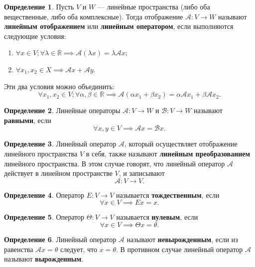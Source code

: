 \documentclass[a5paper, 11pt]{extbook}
\theoremstyle{definition}
\theoremstyle{definition}
\newtheorem{definition}{Определение}[chapter]
\begin{document}
\begin{definition}
    Пусть \(V\) и \(W\) — линейные пространства (либо оба вещественные, либо оба комплексные). Тогда отображение \(\mathcal{A}: V \to W\) называют \textbf{линейным отображением} или \textbf{линейным оператором}, если выполняются следующие условия:
    \begin{enumerate}
        \item \(\forall x \in V; \forall \lambda \in \mathbb{R} \implies \mathcal{A} (\lambda x) = \lambda \mathcal{A} x\);
        \item \(\forall x_1, x_2 \in X \implies \mathcal{A} x + \mathcal{A} y\).
    \end{enumerate}
    Эти два условия можно объединить:
    \[
        \forall x_1, x_2 \in V; \forall \alpha, \beta \in \mathbb{R}
        \implies
        \mathcal{A} (\alpha x_1 + \beta x_2) = \alpha \mathcal{A} x_1 + \beta \mathcal{A} x_2.
    \]
\end{definition}

\begin{definition}
    Линейные операторы \(\mathcal{A}: V \to W\) и \(\mathcal{B}: V \to W\) называют \textbf{равными}, если
    \[
        \forall x, y \in V
        \implies
        \mathcal{A} x = \mathcal{B} x.
    \]
\end{definition}

\begin{definition}
    Линейный оператор \(\mathcal{A}\), который осуществляет отображение линейного пространства \(V\) в себя, также называют \textbf{линейным преобразованием} линейного пространства. В этом случае говорят, что линейный оператор \(\mathcal{A}\) действует в линейном пространстве \(V\), и записывают
    \[
        \mathcal{A}: V \to V.
    \]
\end{definition}

\begin{definition}
    Оператор \(E: V \to V\) называется \textbf{тождественным}, если
    \[
        \forall x \in V \implies E x = x.
    \]
\end{definition}

\begin{definition}
    Оператор \(\Theta: V \to V\) называется \textbf{нулевым}, если
    \[
        \forall x \in V \implies \Theta x = \theta.
    \]
\end{definition}

\begin{definition}
    Линейный оператор \(\mathcal{A}\) называют \textbf{невырожденным}, если из равенства \(\mathcal{A} x = \theta\) следует, что \(x = \theta\). В противном случае линейный оператор \(\mathcal{A}\) называют \textbf{вырожденным}.
\end{definition}
\end{document}
